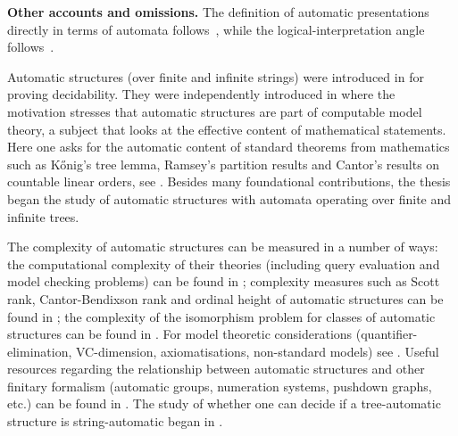 {\bf Other accounts and omissions.} 
The definition of automatic presentations directly in terms of automata follows~\cite{KhNe95}, while the logical-interpretation angle follows~\cite{Blum99,BlGr00,CoLo07}.

Automatic structures (over finite and infinite strings) were introduced in \cite{Hodg76,Hodg83} for proving decidability. They were independently introduced in \cite{KhNe95} where the motivation stresses that automatic structures are part of computable model theory, a subject that looks at the effective content of mathematical statements. Here one asks for the automatic content of standard theorems from mathematics such as K\H{o}nig's tree lemma, Ramsey's partition results and Cantor's results on countable linear orders, see \cite{Rubi08,Kusk03,Kusk10,KuLo10,HuLi13}. Besides many foundational contributions, the thesis \cite{Blum99} began the study of automatic structures with automata operating over finite and infinite trees. 



The complexity of automatic structures can be measured in a number of ways: the computational complexity of their theories (including query evaluation and model checking problems) can be found in  \cite{BlGr00,Kusk09,KuLo11,BaGrRu11,KuWe11}; complexity measures such as Scott rank, Cantor-Bendixson rank and ordinal height of automatic structures can be found in \cite{KRS05,KhMi09,Husc13,HKLL13}; the complexity of the isomorphism problem for classes of automatic structures can be found in \cite{Rubi08,KLL10LICS,KLL13,KLM13,Kuske14}. For model theoretic considerations (quantifier-elimination, VC-dimension, axiomatisations, non-standard models) see \cite{Blum99,BLSS03,BaGrRu11}. Useful resources regarding the relationship between automatic structures and other finitary formalism (automatic groups, numeration systems, pushdown graphs, etc.) can be found in \cite{BlGr00,BaGrRu11,Kart13}. The study of whether one can decide if a tree-automatic structure is string-automatic began in \cite{Husc12}. 

